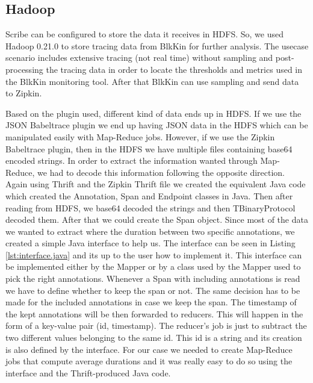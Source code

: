 \subsection{Hadoop}
Scribe can be configured to store the data it receives in HDFS. So, we used
Hadoop 0.21.0 to store tracing data from BlkKin for further analysis. The
usecase scenario includes extensive tracing (not real time) without sampling and
post-processing the tracing data in order to locate the thresholds and metrics
used in the BlkKin monitoring tool. After that BlkKin can use sampling and send
data to Zipkin.

Based on the plugin used, different kind of data ends up in HDFS. If we use the
JSON Babeltrace plugin we end up having JSON data in the HDFS which can be
manipulated easily with Map-Reduce jobs. However, if we use the Zipkin
Babeltrace plugin, then in the HDFS we have multiple files containing base64
encoded strings. In order to extract the information wanted through Map-Reduce,
we had to decode this information following the opposite direction. Again using
Thrift and the Zipkin Thrift file we created the equivalent Java code which
created the Annotation, Span and Endpoint classes in Java. Then after reading
from HDFS, we base64 decoded the strings and then TBinaryProtocol decoded them.
After that we could create the Span object. Since most of the data we wanted to
extract where the duration between two specific annotations, we created a simple
Java interface to help us. The interface can be seen in Listing \ref{lst:interface.java}
and its up to the user how to implement it.
This interface can be implemented either by the
Mapper or by a class used by the Mapper used to pick the right annotations.
Whenever a Span with including annotations is read we have to define whether to
keep the span or not. The same decision has to be made for the included
annotations in case we keep the span. The timestamp of the kept annotations will
be then forwarded to reducers. This will happen in the form of a key-value pair
(id, timestamp). The reducer's job is just to subtract the two different values
belonging to the same id. This id is a string and its creation is also defined
by the interface. For our case we needed to create Map-Reduce jobs that compute
average durations and it was really easy to do so using the interface and the
Thrift-produced Java code.

